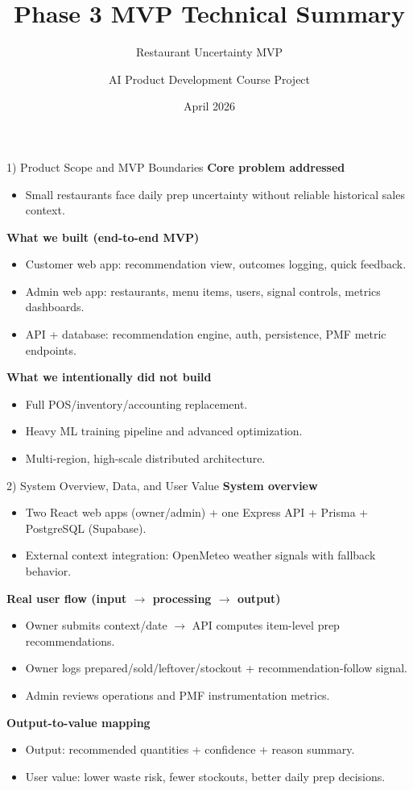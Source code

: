 \documentclass[aspectratio=169]{beamer}
\title{Phase 3 MVP Technical Summary}
\subtitle{Restaurant Uncertainty MVP}
\author{AI Product Development Course Project}
\date{April 2026}
\begin{document}
\begin{frame}
  \titlepage
\end{frame}

\begin{frame}{1) Product Scope and MVP Boundaries}
\textbf{Core problem addressed}
\begin{itemize}
  \item Small restaurants face daily prep uncertainty without reliable historical sales context.
\end{itemize}

\textbf{What we built (end-to-end MVP)}
\begin{itemize}
  \item Customer web app: recommendation view, outcomes logging, quick feedback.
  \item Admin web app: restaurants, menu items, users, signal controls, metrics dashboards.
  \item API + database: recommendation engine, auth, persistence, PMF metric endpoints.
\end{itemize}

\textbf{What we intentionally did not build}
\begin{itemize}
  \item Full POS/inventory/accounting replacement.
  \item Heavy ML training pipeline and advanced optimization.
  \item Multi-region, high-scale distributed architecture.
\end{itemize}
\end{frame}

\begin{frame}{2) System Overview, Data, and User Value}
\textbf{System overview}
\begin{itemize}
  \item Two React web apps (owner/admin) + one Express API + Prisma + PostgreSQL (Supabase).
  \item External context integration: OpenMeteo weather signals with fallback behavior.
\end{itemize}

\textbf{Real user flow (input $\rightarrow$ processing $\rightarrow$ output)}
\begin{itemize}
  \item Owner submits context/date $\rightarrow$ API computes item-level prep recommendations.
  \item Owner logs prepared/sold/leftover/stockout + recommendation-follow signal.
  \item Admin reviews operations and PMF instrumentation metrics.
\end{itemize}

\textbf{Output-to-value mapping}
\begin{itemize}
  \item Output: recommended quantities + confidence + reason summary.
  \item User value: lower waste risk, fewer stockouts, better daily prep decisions.
\end{itemize}
\end{frame}
\end{document}
